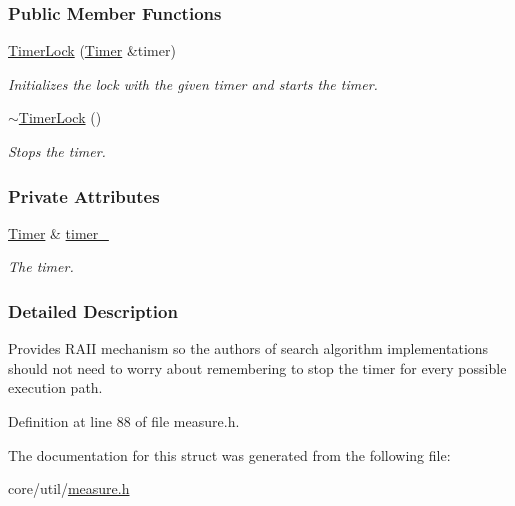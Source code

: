 \subsubsection*{Public Member Functions}
\begin{DoxyCompactItemize}
\item 
\hyperlink{structslb_1_1core_1_1util_1_1TimerLock_aa95b251cb0378c20ca28ab0221e5ece8}{Timer\+Lock} (\hyperlink{structslb_1_1core_1_1util_1_1Timer}{Timer} \&timer)\hypertarget{structslb_1_1core_1_1util_1_1TimerLock_aa95b251cb0378c20ca28ab0221e5ece8}{}\label{structslb_1_1core_1_1util_1_1TimerLock_aa95b251cb0378c20ca28ab0221e5ece8}

\begin{DoxyCompactList}\small\item\em Initializes the lock with the given timer and starts the timer. \end{DoxyCompactList}\item 
\hyperlink{structslb_1_1core_1_1util_1_1TimerLock_aa3d98d4e53701b106f52a1f6f90e3959}{$\sim$\+Timer\+Lock} ()\hypertarget{structslb_1_1core_1_1util_1_1TimerLock_aa3d98d4e53701b106f52a1f6f90e3959}{}\label{structslb_1_1core_1_1util_1_1TimerLock_aa3d98d4e53701b106f52a1f6f90e3959}

\begin{DoxyCompactList}\small\item\em Stops the timer. \end{DoxyCompactList}\end{DoxyCompactItemize}
\subsubsection*{Private Attributes}
\begin{DoxyCompactItemize}
\item 
\hyperlink{structslb_1_1core_1_1util_1_1Timer}{Timer} \& \hyperlink{structslb_1_1core_1_1util_1_1TimerLock_aefc48af32446851f915eee79575ee735}{timer\+\_\+}\hypertarget{structslb_1_1core_1_1util_1_1TimerLock_aefc48af32446851f915eee79575ee735}{}\label{structslb_1_1core_1_1util_1_1TimerLock_aefc48af32446851f915eee79575ee735}

\begin{DoxyCompactList}\small\item\em The timer. \end{DoxyCompactList}\end{DoxyCompactItemize}


\subsubsection{Detailed Description}
Provides R\+A\+II mechanism so the authors of search algorithm implementations should not need to worry about remembering to stop the timer for every possible execution path. 

Definition at line 88 of file measure.\+h.



The documentation for this struct was generated from the following file\+:\begin{DoxyCompactItemize}
\item 
core/util/\hyperlink{measure_8h}{measure.\+h}\end{DoxyCompactItemize}
